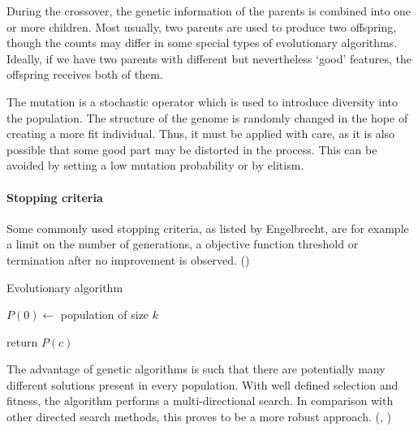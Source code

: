 During the crossover, the genetic information of the parents is combined into
one or more children. Most usually, two parents are used to produce two
offspring, though the counts may differ in some special types of evolutionary
algorithms. Ideally, if we have two parents with different but nevertheless
`good' features, the offspring receives both of them.
\citep{Eiben:2015:IEC:2810085}

The mutation is a stochastic operator which is used to introduce diversity into
the population. The structure of the genome is randomly changed in the hope
of creating a more fit individual. Thus, it must be applied with care, as it is
also possible that some good part may be distorted in the process. This can be
avoided by setting a low mutation probability or by elitism.

\paragraph{Stopping criteria}
Some commonly used stopping criteria, as listed by Engelbrecht, are for example 
a limit on the number of generations, a objective function threshold or
termination after no improvement is observed.
(\citep{Engelbrecht:2007:CII:1557464})


\begin{algorithm}
\DontPrintSemicolon 
\caption{Evolutionary algorithm\label{alg:EA}}
  \;
  $P(0) \longleftarrow$ population of size $k$

  \;
  return $P(c)$  
\end{algorithm}

The advantage of genetic algorithms is such that there are potentially 
many different solutions present in every population. With well defined 
selection and fitness, the algorithm performs a multi-directional search. 
In comparison with other directed search methods, this proves to be a more 
robust approach. (\cite{Michalewicz:1996:GAD:229930}, 
\cite{Mitchell:1997:ML:541177}) %

